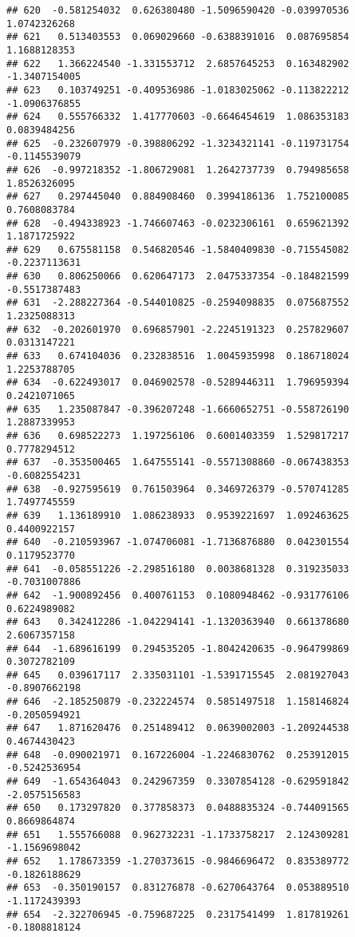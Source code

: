\documentclass[
]{article}
\begin{document}
\begin{verbatim}
## 620  -0.581254032  0.626380480 -1.5096590420 -0.039970536  1.0742326268
## 621   0.513403553  0.069029660 -0.6388391016  0.087695854  1.1688128353
## 622   1.366224540 -1.331553712  2.6857645253  0.163482902 -1.3407154005
## 623   0.103749251 -0.409536986 -1.0183025062 -0.113822212 -1.0906376855
## 624   0.555766332  1.417770603 -0.6646454619  1.086353183  0.0839484256
## 625  -0.232607979 -0.398806292 -1.3234321141 -0.119731754 -0.1145539079
## 626  -0.997218352 -1.806729081  1.2642737739  0.794985658  1.8526326095
## 627   0.297445040  0.884908460  0.3994186136  1.752100085  0.7608083784
## 628  -0.494338923 -1.746607463 -0.0232306161  0.659621392  1.1871725922
## 629   0.675581158  0.546820546 -1.5840409830 -0.715545082 -0.2237113631
## 630   0.806250066  0.620647173  2.0475337354 -0.184821599 -0.5517387483
## 631  -2.288227364 -0.544010825 -0.2594098835  0.075687552  1.2325088313
## 632  -0.202601970  0.696857901 -2.2245191323  0.257829607  0.0313147221
## 633   0.674104036  0.232838516  1.0045935998  0.186718024  1.2253788705
## 634  -0.622493017  0.046902578 -0.5289446311  1.796959394  0.2421071065
## 635   1.235087847 -0.396207248 -1.6660652751 -0.558726190  1.2887339953
## 636   0.698522273  1.197256106  0.6001403359  1.529817217  0.7778294512
## 637  -0.353500465  1.647555141 -0.5571308860 -0.067438353 -0.6082554231
## 638  -0.927595619  0.761503964  0.3469726379 -0.570741285  1.7497745559
## 639   1.136189910  1.086238933  0.9539221697  1.092463625  0.4400922157
## 640  -0.210593967 -1.074706081 -1.7136876880  0.042301554  0.1179523770
## 641  -0.058551226 -2.298516180  0.0038681328  0.319235033 -0.7031007886
## 642  -1.900892456  0.400761153  0.1080948462 -0.931776106  0.6224989082
## 643   0.342412286 -1.042294141 -1.1320363940  0.661378680  2.6067357158
## 644  -1.689616199  0.294535205 -1.8042420635 -0.964799869  0.3072782109
## 645   0.039617117  2.335031101 -1.5391715545  2.081927043 -0.8907662198
## 646  -2.185250879 -0.232224574  0.5851497518  1.158146824 -0.2050594921
## 647   1.871620476  0.251489412  0.0639002003 -1.209244538  0.4674430423
## 648  -0.090021971  0.167226004 -1.2246830762  0.253912015 -0.5242536954
## 649  -1.654364043  0.242967359  0.3307854128 -0.629591842 -2.0575156583
## 650   0.173297820  0.377858373  0.0488835324 -0.744091565  0.8669864874
## 651   1.555766088  0.962732231 -1.1733758217  2.124309281 -1.1569698042
## 652   1.178673359 -1.270373615 -0.9846696472  0.835389772 -0.1826188629
## 653  -0.350190157  0.831276878 -0.6270643764  0.053889510 -1.1172439393
## 654  -2.322706945 -0.759687225  0.2317541499  1.817819261 -0.1808818124

\end{verbatim}
\end{document}
